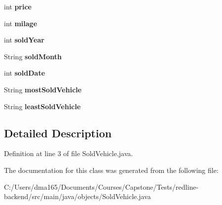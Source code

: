 \begin{DoxyCompactItemize}
\mbox{\label{classobjects_1_1_sold_vehicle_a066e562d9f428fd18c49eddc681431a2}} 
int {\bfseries price}
\item 
\mbox{\label{classobjects_1_1_sold_vehicle_a401c2fc79a7f347837f48255c870c052}} 
int {\bfseries milage}
\item 
\mbox{\label{classobjects_1_1_sold_vehicle_a00975a8bb762ee21f12bd26cdd776124}} 
int {\bfseries sold\+Year}
\item 
\mbox{\label{classobjects_1_1_sold_vehicle_ab5e4b23703bc80c5ff7409b77552cd55}} 
String {\bfseries sold\+Month}
\item 
\mbox{\label{classobjects_1_1_sold_vehicle_a1b0c9aa0177681da912cbc4df5bcb67e}} 
int {\bfseries sold\+Date}
\item 
\mbox{\label{classobjects_1_1_sold_vehicle_aca10ca9ee8df46af8f4dad7600789f87}} 
String {\bfseries most\+Sold\+Vehicle}
\item 
\mbox{\label{classobjects_1_1_sold_vehicle_a5a53eeed6ee4537957f2b2ef75eb3c63}} 
String {\bfseries least\+Sold\+Vehicle}
\end{DoxyCompactItemize}


\subsection{Detailed Description}


Definition at line 3 of file Sold\+Vehicle.\+java.



The documentation for this class was generated from the following file\+:\begin{DoxyCompactItemize}
\item 
C\+:/\+Users/dma165/\+Documents/\+Courses/\+Capstone/\+Tests/redline-\/backend/src/main/java/objects/Sold\+Vehicle.\+java\end{DoxyCompactItemize}
